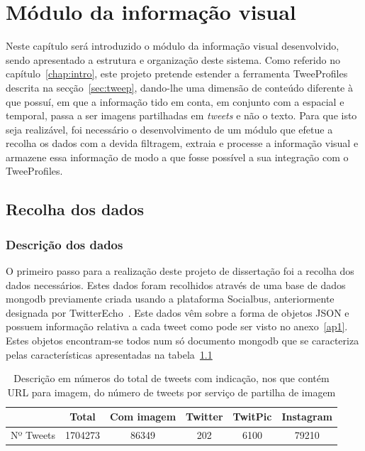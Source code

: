 \chapter{Módulo da informação visual} \label{chap:chap3}

Neste capítulo será introduzido o módulo da informação visual desenvolvido, sendo apresentado a estrutura e organização deste sistema. Como referido no capítulo~\ref{chap:intro}, este projeto pretende estender a ferramenta TweeProfiles descrita na secção~\ref{sec:tweep}, dando-lhe uma dimensão de conteúdo diferente à que possuí, em que a informação tido em conta, em conjunto com a espacial e temporal, passa a ser imagens partilhadas em \textit{tweets} e não o texto. Para que isto seja realizável, foi necessário o desenvolvimento de um módulo que efetue a recolha os dados com a devida filtragem, extraia e processe a informação visual e armazene essa informação de modo a que fosse possível a sua integração com o TweeProfiles.

\section{Recolha dos dados}

\subsection{Descrição dos dados}

O primeiro passo para a realização deste projeto de dissertação foi a recolha dos dados necessários. Estes dados foram recolhidos através de uma base de dados mongodb previamente criada usando a plataforma Socialbus, anteriormente designada por TwitterEcho~\cite{Boanjak2012}. Este dados vêm sobre a forma de objetos JSON e possuem informação relativa a cada tweet como pode ser visto no anexo~\ref{ap1}. Estes objetos encontram-se todos num só documento mongodb que se caracteriza pelas características apresentadas na tabela~\ref{tab:nbrtweets}

\vspace{5 mm}
\begin{table}[h]
\centering
\begin{tabular}{|l|c|c|l|l|l|}
\hline
          & Total                        & Com imagem & Twitter                  & TwitPic                   & Instagram                  \\ \hline
Nº Tweets & \multicolumn{1}{r|}{1704273} & 86349      & \multicolumn{1}{c|}{202} & \multicolumn{1}{c|}{6100} & \multicolumn{1}{c|}{79210} \\ \hline
\end{tabular}
\caption{Descrição em números do total de tweets com indicação, nos que contém URL para imagem, do número de tweets por serviço de partilha de imagem}
\label{tab:nbrtweets}
\end{table}
\vspace{5 mm}

